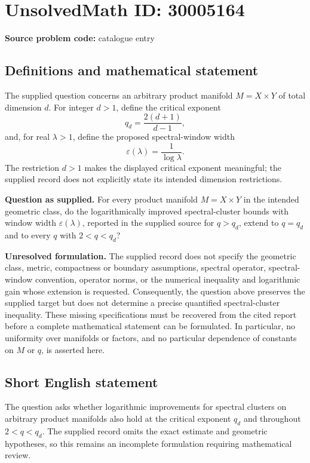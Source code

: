 \documentclass[11pt]{article}
\begin{document}
\section*{UnsolvedMath ID: 30005164}
\textbf{Source problem code:} catalogue entry
\subsection{Definitions and mathematical statement}
The supplied question concerns an arbitrary product manifold \(M=X\times Y\) of total dimension \(d\). For integer \(d>1\), define the critical exponent
\[
q_d=\frac{2(d+1)}{d-1},
\]
and, for real \(\lambda>1\), define the proposed spectral-window width
\[
\varepsilon(\lambda)=\frac{1}{\log\lambda}.
\]
The restriction \(d>1\) makes the displayed critical exponent meaningful; the supplied record does not explicitly state its intended dimension restrictions.

\textbf{Question as supplied.} For every product manifold \(M=X\times Y\) in the intended geometric class, do the logarithmically improved spectral-cluster bounds with window width \(\varepsilon(\lambda)\), reported in the supplied source for \(q>q_d\), extend to \(q=q_d\) and to every \(q\) with \(2<q<q_d\)?

\textbf{Unresolved formulation.} The supplied record does not specify the geometric class, metric, compactness or boundary assumptions, spectral operator, spectral-window convention, operator norms, or the numerical inequality and logarithmic gain whose extension is requested. Consequently, the question above preserves the supplied target but does not determine a precise quantified spectral-cluster inequality. These missing specifications must be recovered from the cited report before a complete mathematical statement can be formulated. In particular, no uniformity over manifolds or factors, and no particular dependence of constants on \(M\) or \(q\), is asserted here.
\subsection{Short English statement}
The question asks whether logarithmic improvements for spectral clusters on arbitrary product manifolds also hold at the critical exponent \(q_d\) and throughout \(2<q<q_d\). The supplied record omits the exact estimate and geometric hypotheses, so this remains an incomplete formulation requiring mathematical review.
\end{document}
